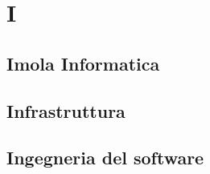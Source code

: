 \section{I} 
\subsection{Imola Informatica} 

\subsection{Infrastruttura} 

\subsection{Ingegneria del software} 

